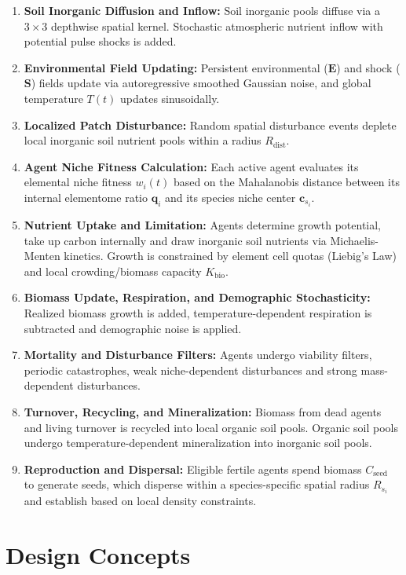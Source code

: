\documentclass[11pt,a4paper]{article}
\begin{document}
\begin{enumerate}
    \item \textbf{Soil Inorganic Diffusion and Inflow:} Soil inorganic pools diffuse via a $3 \times 3$ depthwise spatial kernel. Stochastic atmospheric nutrient inflow with potential pulse shocks is added.
    \item \textbf{Environmental Field Updating:} Persistent environmental ($\mathbf{E}$) and shock ($\mathbf{S}$) fields update via autoregressive smoothed Gaussian noise, and global temperature $T(t)$ updates sinusoidally.
    \item \textbf{Localized Patch Disturbance:} Random spatial disturbance events deplete local inorganic soil nutrient pools within a radius $R_{\text{dist}}$.
    \item \textbf{Agent Niche Fitness Calculation:} Each active agent evaluates its elemental niche fitness $w_i(t)$ based on the Mahalanobis distance between its internal elementome ratio $\boldsymbol{q}_i$ and its species niche center $\boldsymbol{c}_{s_i}$.
    \item \textbf{Nutrient Uptake and Limitation:} Agents determine growth potential, take up carbon internally and draw inorganic soil nutrients via Michaelis-Menten kinetics. Growth is constrained by element cell quotas (Liebig's Law) and local crowding/biomass capacity $K_{\text{bio}}$.
    \item \textbf{Biomass Update, Respiration, and Demographic Stochasticity:} Realized biomass growth is added, temperature-dependent respiration is subtracted and demographic noise is applied.
    \item \textbf{Mortality and Disturbance Filters:} Agents undergo viability filters, periodic catastrophes, weak niche-dependent disturbances and strong mass-dependent disturbances.
    \item \textbf{Turnover, Recycling, and Mineralization:} Biomass from dead agents and living turnover is recycled into local organic soil pools. Organic soil pools undergo temperature-dependent mineralization into inorganic soil pools.
    \item \textbf{Reproduction and Dispersal:} Eligible fertile agents spend biomass $C_{\text{seed}}$ to generate seeds, which disperse within a species-specific spatial radius $R_{s_i}$ and establish based on local density constraints.
\end{enumerate}

\section{Design Concepts}
\end{document}
